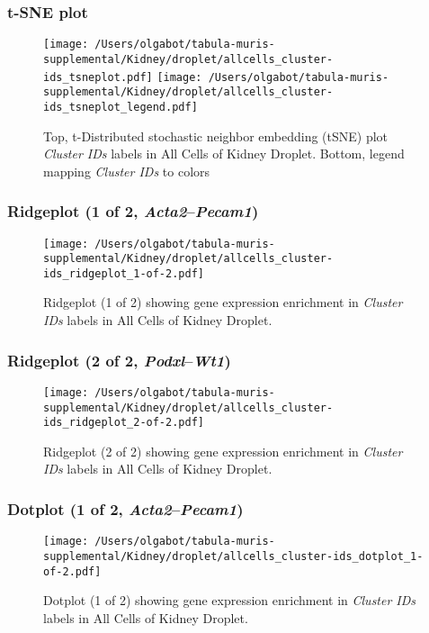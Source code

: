 \clearpage
\subsubsection{t-SNE plot}
\begin{figure}[h]
\centering
\texttt{[image: /Users/olgabot/tabula-muris-supplemental/Kidney/droplet/allcells\_cluster-ids\_tsneplot.pdf]}
\texttt{[image: /Users/olgabot/tabula-muris-supplemental/Kidney/droplet/allcells\_cluster-ids\_tsneplot\_legend.pdf]}
\caption{Top, t-Distributed stochastic neighbor embedding (tSNE) plot  \emph{Cluster IDs} labels in All Cells of Kidney Droplet. Bottom, legend mapping \emph{Cluster IDs} to colors}
\end{figure}


\clearpage

\subsubsection{Ridgeplot (1 of 2, \emph{Acta2}--\emph{Pecam1})}
\begin{figure}[h]
\centering
\texttt{[image: /Users/olgabot/tabula-muris-supplemental/Kidney/droplet/allcells\_cluster-ids\_ridgeplot\_1-of-2.pdf]}

\caption{ Ridgeplot (1 of 2)  showing gene expression enrichment in \emph{Cluster IDs} labels in All Cells of Kidney Droplet. }
\end{figure}


\clearpage

\subsubsection{Ridgeplot (2 of 2, \emph{Podxl}--\emph{Wt1})}
\begin{figure}[h]
\centering
\texttt{[image: /Users/olgabot/tabula-muris-supplemental/Kidney/droplet/allcells\_cluster-ids\_ridgeplot\_2-of-2.pdf]}

\caption{ Ridgeplot (2 of 2)  showing gene expression enrichment in \emph{Cluster IDs} labels in All Cells of Kidney Droplet. }
\end{figure}


\clearpage

\subsubsection{Dotplot (1 of 2, \emph{Acta2}--\emph{Pecam1})}
\begin{figure}[h]
\centering
\texttt{[image: /Users/olgabot/tabula-muris-supplemental/Kidney/droplet/allcells\_cluster-ids\_dotplot\_1-of-2.pdf]}

\caption{ Dotplot (1 of 2)  showing gene expression enrichment in \emph{Cluster IDs} labels in All Cells of Kidney Droplet. }
\end{figure}



